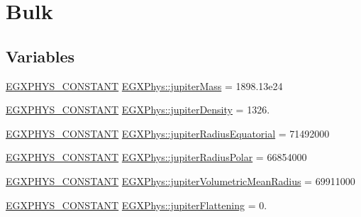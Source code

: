 \hypertarget{group___e_g_x_phys-_constants-_astrophysics-_solar_system-_jupiter-_bulk}{}\section{Bulk}
\label{group___e_g_x_phys-_constants-_astrophysics-_solar_system-_jupiter-_bulk}
\subsection*{Variables}
\begin{DoxyCompactItemize}
\item 
\mbox{\hyperlink{group___e_g_x_phys-_constants-_macros_ga76980d288494ce1714c9ac68a95ba702}{E\+G\+X\+P\+H\+Y\+S\+\_\+\+C\+O\+N\+S\+T\+A\+NT}} \mbox{\hyperlink{group___e_g_x_phys-_constants-_astrophysics-_solar_system-_jupiter-_bulk_ga8a78b1db0a9c538857855b43a3bc47e6}{E\+G\+X\+Phys\+::jupiter\+Mass}} = 1898.\+13e24
\item 
\mbox{\hyperlink{group___e_g_x_phys-_constants-_macros_ga76980d288494ce1714c9ac68a95ba702}{E\+G\+X\+P\+H\+Y\+S\+\_\+\+C\+O\+N\+S\+T\+A\+NT}} \mbox{\hyperlink{group___e_g_x_phys-_constants-_astrophysics-_solar_system-_jupiter-_bulk_gafc5e9529e45112431da46f9433c300ed}{E\+G\+X\+Phys\+::jupiter\+Density}} = 1326.
\item 
\mbox{\hyperlink{group___e_g_x_phys-_constants-_macros_ga76980d288494ce1714c9ac68a95ba702}{E\+G\+X\+P\+H\+Y\+S\+\_\+\+C\+O\+N\+S\+T\+A\+NT}} \mbox{\hyperlink{group___e_g_x_phys-_constants-_astrophysics-_solar_system-_jupiter-_bulk_gae10498fbbb0666a828130575ffc28d6e}{E\+G\+X\+Phys\+::jupiter\+Radius\+Equatorial}} = 71492000
\item 
\mbox{\hyperlink{group___e_g_x_phys-_constants-_macros_ga76980d288494ce1714c9ac68a95ba702}{E\+G\+X\+P\+H\+Y\+S\+\_\+\+C\+O\+N\+S\+T\+A\+NT}} \mbox{\hyperlink{group___e_g_x_phys-_constants-_astrophysics-_solar_system-_jupiter-_bulk_ga7b2626988078bb3648e4a4238b36c825}{E\+G\+X\+Phys\+::jupiter\+Radius\+Polar}} = 66854000
\item 
\mbox{\hyperlink{group___e_g_x_phys-_constants-_macros_ga76980d288494ce1714c9ac68a95ba702}{E\+G\+X\+P\+H\+Y\+S\+\_\+\+C\+O\+N\+S\+T\+A\+NT}} \mbox{\hyperlink{group___e_g_x_phys-_constants-_astrophysics-_solar_system-_jupiter-_bulk_gab96ee9108c321647b7ae0c490e797b6f}{E\+G\+X\+Phys\+::jupiter\+Volumetric\+Mean\+Radius}} = 69911000
\item 
\mbox{\hyperlink{group___e_g_x_phys-_constants-_macros_ga76980d288494ce1714c9ac68a95ba702}{E\+G\+X\+P\+H\+Y\+S\+\_\+\+C\+O\+N\+S\+T\+A\+NT}} \mbox{\hyperlink{group___e_g_x_phys-_constants-_astrophysics-_solar_system-_jupiter-_bulk_gad468e6d4f1654ea8065a49a39302b039}{E\+G\+X\+Phys\+::jupiter\+Flattening}} = 0.

\end{DoxyCompactItemize}
